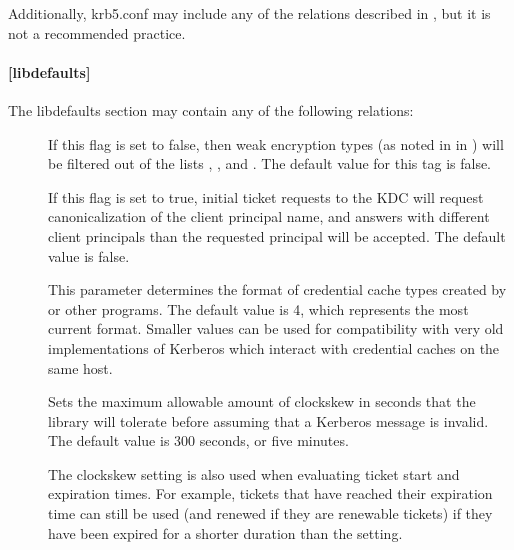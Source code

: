 \documentclass[letterpaper,10pt,english]{sphinxmanual}
\begin{document}
Additionally, krb5.conf may include any of the relations described in
{\hyperref[\detokenize{admin/conf_files/kdc_conf:kdc-conf-5}]{}}, but it is not a recommended practice.


\paragraph{{[}libdefaults{]}}
\label{\detokenize{admin/conf_files/krb5_conf:libdefaults}}\label{\detokenize{admin/conf_files/krb5_conf:id1}}
The libdefaults section may contain any of the following relations:
\begin{description}
\item[{}] \leavevmode
If this flag is set to false, then weak encryption types (as noted
in {\hyperref[\detokenize{admin/conf_files/kdc_conf:encryption-types}]{}} in {\hyperref[\detokenize{admin/conf_files/kdc_conf:kdc-conf-5}]{}}) will be filtered
out of the lists ,
, and .  The default
value for this tag is false.

\item[{}] \leavevmode
If this flag is set to true, initial ticket requests to the KDC
will request canonicalization of the client principal name, and
answers with different client principals than the requested
principal will be accepted.  The default value is false.

\item[{}] \leavevmode
This parameter determines the format of credential cache types
created by  or other programs.  The default value
is 4, which represents the most current format.  Smaller values
can be used for compatibility with very old implementations of
Kerberos which interact with credential caches on the same host.

\item[{}] \leavevmode
Sets the maximum allowable amount of clockskew in seconds that the
library will tolerate before assuming that a Kerberos message is
invalid.  The default value is 300 seconds, or five minutes.

The clockskew setting is also used when evaluating ticket start
and expiration times.  For example, tickets that have reached
their expiration time can still be used (and renewed if they are
renewable tickets) if they have been expired for a shorter
duration than the  setting.


\end{description}
\end{document}
